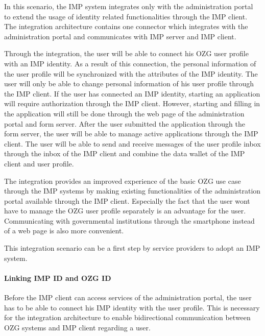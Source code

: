 \documentclass[
     12pt,         %
     a4paper,      %
     BCOR=10mm,version=first,     %
     DIV=14,version=first,        %
     ]{scrreprt}
\begin{document}
In this scenario, the IMP system integrates only with the administration portal to extend the usage of identity related functionalities through the IMP client. The integration architecture contains one connector which integrates with the administration portal and communicates with IMP server and IMP client.

Through the integration, the user will be able to connect his OZG user profile with an IMP identity. As a result of this connection, the personal information of the user profile will be synchronized with the attributes of the IMP identity. The user will only be able to change personal information of his user profile through the IMP client. If the user has connected an IMP identity, starting an application will require authorization through the IMP client. However, starting and filling in the application will still be done through the web page of the administration portal and form server. After the user submitted the application through the form server, the user will be able to manage active applications through the IMP client.
The user will be able to send and receive messages of the user profile inbox through the inbox of the IMP client and combine the data wallet of the IMP client and user profile.

The integration provides an improved experience of the basic OZG use case through the IMP systems by making existing functionalities of the administration portal available through the IMP client. Especially the fact that the user wont have to manage the OZG user profile separately is an advantage for the user. Communicating with governmental institutions through the smartphone instead of a web page is also more convenient.

This integration scenario can be a first step by service providers to adopt an IMP system.

\paragraph{Linking IMP ID and OZG ID}

Before the IMP client can access services of the administration portal, the user has to be able to connect his IMP identity with the user profile. This is necessary for the integration architecture to enable bidirectional communication between OZG systems and IMP client regarding a user.
\end{document}
